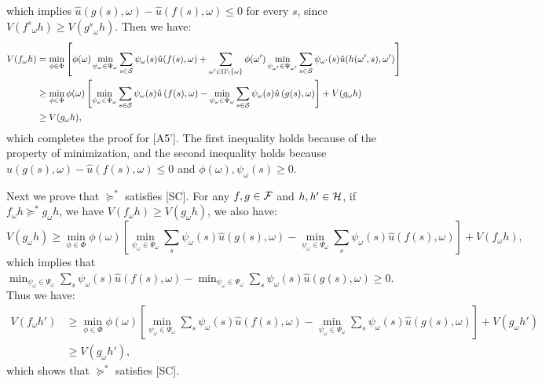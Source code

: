 \documentclass[11pt,oneside]{article}
\theoremstyle{plain}
\theoremstyle{plain}
\theoremstyle{plain}
\theoremstyle{plain}
\theoremstyle{plain}
\theoremstyle{definition}
\theoremstyle{definition}
\theoremstyle{remark}
\theoremstyle{plain}
\newcommand{\F}{{\cal F}}
\newcommand{\mcs}{{\cal S}}
\newcommand{\pfs}{\succeq^*}
\newcommand{\omix}[2]{#1_\omega #2 }
\begin{document}
which implies $\hat{u}\left( g(s),\omega\right) - \hat{u}\left( f(s),\omega\right) \leq 0$ for every $s$, since $V\left( {f^s}_\omega h\right) \geq V\left( {g^s}_\omega h \right)$. Then we have:
\begin{align*}
    V(f_\omega h) &= \min_{\phi \in \Phi}  \left[ \phi(\omega) \min_{\psi_\omega \in \Psi_\omega} \sum_{s\in \mcs} \psi_\omega(s)  \hat{u}(f(s),\omega) + \sum_{\omega' \in \Omega\setminus\{\omega\}} \phi(\omega') \min_{\psi_{\omega'} \in \Psi_{\omega'}}  \sum_{s\in \mcs}\psi_{\omega'}(s) \hat{u}(h(\omega',s),\omega') \right] \\
    & \geq \min_{\phi \in \Phi} \phi(\omega) \left[ \min_{\psi_\omega \in \Psi_\omega} \sum_{s\in \mcs} \psi_\omega(s)  \hat{u} \left(f(s),\omega\right)  -   \min_{\psi_\omega \in \Psi_\omega} \sum_{s\in \mcs} \psi_\omega(s) \hat{u} \left(g(s),\omega \right)\right] + V(g_\omega h) \\
    & \geq V(g_\omega h),
\end{align*}
which completes the proof for [A5']. The first inequality holds because of the property of minimization, and the second inequality holds because $\hat{u}\left( g(s),\omega\right) - \hat{u}\left( f(s),\omega\right) \leq 0$ and $\phi(\omega), \psi_\omega(s) \geq 0$.

Next we prove that $\pfs$ satisfies [SC]. For any $f,g \in \F$ and $h,h' \in {\cal H}$, if $\omix{f}{h} \pfs \omix{g}{h}$, we have $V(\omix{f}{h}) \geq V(\omix{g}{h})$, we also have:
\[
V(\omix{g}{h}) \geq \min_{\phi \in \Phi} \phi(\omega) \left[ \min_{\psi_\omega \in \Psi_\omega} \sum_s \psi_\omega(s) \hat{u} \left(g(s),\omega\right)  -  \min_{\psi_\omega \in \Psi_\omega} \sum_s \psi_\omega(s) \hat{u} \left(f(s),\omega\right)\right] + V(\omix{f}{h}),
\]
which implies that $ \min_{\psi_\omega \in \Psi_\omega} \sum_s \psi_\omega(s) \hat{u} \left(f(s),\omega\right)  - \min_{\psi_\omega \in \Psi_\omega} \sum_s \psi_\omega(s) \hat{u} \left(g(s),\omega\right) \geq 0$. Thus we have:
\begin{align*}
V(\omix{f}{h'}) & \geq \min_{\phi \in \Phi} \phi(\omega) \left[ \min_{\psi_\omega \in \Psi_\omega} \sum_s \psi_\omega(s) \hat{u} \left(f(s),\omega\right)  - \min_{\psi_\omega \in \Psi_\omega} \sum_s \psi_\omega(s) \hat{u} \left(g(s),\omega\right) \right]  + V(\omix{g}{h'}) \\
& \geq V(\omix{g}{h'}),
\end{align*}
which shows that $\pfs$ satisfies [SC].
\end{document}
